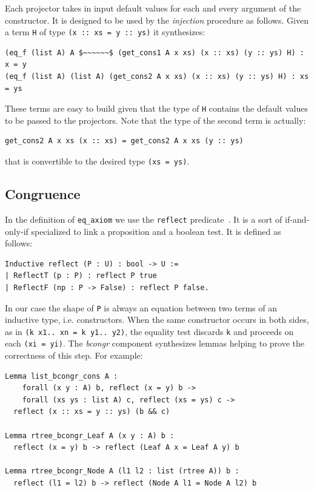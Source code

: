 \documentclass[a4paper,UKenglish,cleveref, autoref]{lipics-v2019}
\newcommand{\derive}[1]{\emph{#1}}
\begin{document}
\noindent
Each projector takes in input default values for each and every
argument of the constructor. It is designed to be used by the
\derive{injection} procedure as follows. Given a term
\lstinline+H+ of type \lstinline+(x :: xs = y :: ys)+
it synthesizes:
\begin{lstlisting}
(eq_f (list A) A $~~~~~~$ (get_cons1 A x xs) (x :: xs) (y :: ys) H) : x = y
(eq_f (list A) (list A) (get_cons2 A x xs) (x :: xs) (y :: ys) H) : xs = ys
\end{lstlisting}

\noindent
These terms are easy to build given that the type of \lstinline+H+
contains the default values to be passed to the projectors.
Note that the type of the second term is actually:
\begin{lstlisting}
get_cons2 A x xs (x :: xs) = get_cons2 A x xs (y :: ys)
\end{lstlisting}

\noindent
that is convertible to the desired type \lstinline+(xs = ys)+.

\subsection{Congruence} %
\label{sec:reflect}

In the definition of \lstinline+eq_axiom+ we use the \lstinline+reflect+
predicate~\cite{mcb}. It is a sort of if-and-only-if specialized to link a
proposition and a boolean test. It is defined as follows:
\begin{lstlisting}
Inductive reflect (P : U) : bool -> U :=
| ReflectT (p : P) : reflect P true
| ReflectF (np : P -> False) : reflect P false.
\end{lstlisting}

\noindent
In our case the shape of
\lstinline+P+ is always an equation between two terms of
an inductive type, i.e. constructors.
When the same constructor occurs in both sides, as in
\lstinline+(k x1.. xn = k y1.. y2)+, the equality test
discards \lstinline+k+ and proceeds on each \lstinline+(xi = yi)+.
The \derive{bcongr} component synthesizes lemmas
helping to prove the correctness of this step. For example:
\begin{lstlisting}
Lemma list_bcongr_cons A :
    forall (x y : A) b, reflect (x = y) b ->
    forall (xs ys : list A) c, reflect (xs = ys) c ->
  reflect (x :: xs = y :: ys) (b && c)

Lemma rtree_bcongr_Leaf A (x y : A) b :
  reflect (x = y) b -> reflect (Leaf A x = Leaf A y) b

Lemma rtree_bcongr_Node A (l1 l2 : list (rtree A)) b :
  reflect (l1 = l2) b -> reflect (Node A l1 = Node A l2) b
\end{lstlisting}
\end{document}
